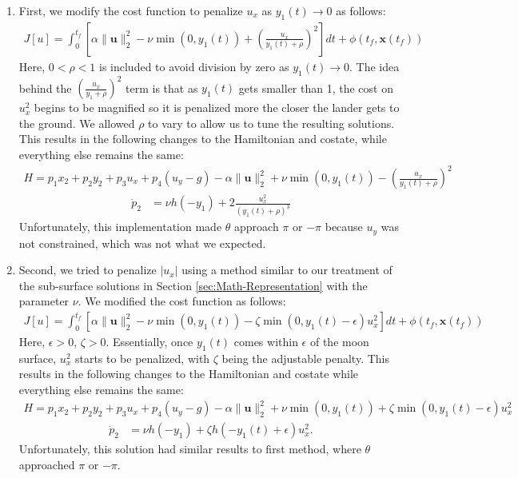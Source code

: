\documentclass{article}
\begin{document}
\begin{enumerate}
    \item First, we modify the cost function to penalize $u_x$ as $y_1(t)\rightarrow0$ as follows:
    \begin{align}
    J[u] = \int_{0}^{t_f} \left[\alpha \|\mathbf{u}\|_2^2 - \nu\min(0, y_1(t)) + \left(\frac{u_x}{y_1(t) + \rho}\right)^2\right] dt + \phi(t_f, \mathbf{x}(t_f)) 
    \end{align}
    Here, $0<\rho <1$ is included to avoid division by zero as $y_1(t)\rightarrow0$. The idea behind the $(\frac{u_x}{y_1 + \rho})^2$ term is that as $y_1(t)$ gets smaller than 1, the cost on $u_x^2$ begins to be magnified so it is penalized more the closer the lander gets to the ground. We allowed $\rho$ to vary to allow us to tune the resulting solutions.  
    This results in the following changes to the Hamiltonian and costate, while everything else remains the same:
    \begin{align}
    H = p_1 x_2 + p_2 y_2 + p_3 u_x + p_4(u_y - g) - \alpha \|\mathbf{u}\|_2^2 + \nu\min(0, y_1(t)) - \left(\frac{u_x}{y_1(t) + \rho}\right)^2
    \end{align}
    \begin{align}
    \dot{p}_2 & = \nu h(-y_1)  + 2\frac{u_x^2}{(y_1(t) + \rho)^3}
    \end{align}
    Unfortunately, this implementation made $\theta$ approach $\pi$ or $-\pi$ because $u_y$ was not constrained, which was not what we expected.
    \item Second, 
    we tried to penalize $|u_x|$ using a method similar to our treatment of the sub-surface solutions in Section \ref{sec:Math-Representation} with the parameter $\nu$. We modified the cost function as follows:
    \begin{align}
    J[u] = \int_{0}^{t_f} \left[\alpha \|\mathbf{u}\|_2^2 - \nu\min(0, y_1(t)) - \zeta\min(0, y_1(t) - \epsilon)u_x^2\right] dt + \phi(t_f, \mathbf{x}(t_f))
    \end{align}
    Here, $\epsilon > 0$, $\zeta > 0$. Essentially, once $y_1(t)$ comes within $\epsilon$ of the moon surface, $u_x^2$ starts to be penalized, with $\zeta$ being the adjustable penalty. 
    This results in the following changes to the Hamiltonian and costate while everything else remains the same:
    \begin{align}
    H = p_1 x_2 + p_2 y_2 + p_3 u_x + p_4(u_y - g) - \alpha \|\mathbf{u}\|_2^2 + \nu\min(0, y_1(t)) +  \zeta\min(0, y_1(t)-\epsilon)u_x^2
    \end{align}
    \begin{align}
    \dot{p}_2 & = \nu h(-y_1)  + \zeta h(-y_1(t)+\epsilon)u_x^2.
    \end{align}
    Unfortunately, this solution had similar results to first method, where $\theta$ approached $\pi$ or $-\pi$.
\end{enumerate}
\end{document}
